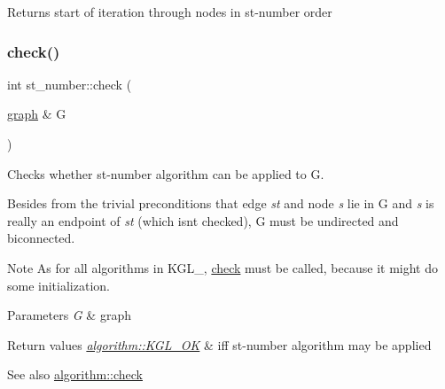 \begin{DoxyReturn}{Returns}
start of iteration through nodes in st-\/number order 
\end{DoxyReturn}
\mbox{\label{classst__number_a2aad4550b821c52d6998bff35fd8648f}} 
\subsubsection{\texorpdfstring{check()}{check()}}
{\footnotesize\ttfamily int st\+\_\+number\+::check (\begin{DoxyParamCaption}\item[{\mbox{\hyperlink{classgraph}{graph}} \&}]{G }\end{DoxyParamCaption})\hspace{0.3cm}{\ttfamily [virtual]}}



Checks whether st-\/number algorithm can be applied to {\ttfamily G}. 

Besides from the trivial preconditions that edge {\itshape st} and node {\itshape s} lie in {\ttfamily G} and {\itshape s} is really an endpoint of {\itshape st} (which isn\textquotesingle{}t checked), {\ttfamily G} must be undirected and biconnected. \begin{DoxyNote}{Note}
As for all algorithms in K\+G\+L\+\_\+, \mbox{\hyperlink{classst__number_a2aad4550b821c52d6998bff35fd8648f}{check}} must be called, because it might do some initialization.
\end{DoxyNote}

\begin{DoxyParams}{Parameters}
{\em G} & graph\\
\hline
\end{DoxyParams}

\begin{DoxyRetVals}{Return values}
{\em \mbox{\hyperlink{classalgorithm_af1a0078e153aa99c24f9bdf0d97f6710aae4c1cd7fe8d8cf4b143241a6e7c31cf}{algorithm\+::\+K\+G\+L\+\_\+\+OK}}} & iff st-\/number algorithm may be applied\\
\hline
\end{DoxyRetVals}
\begin{DoxySeeAlso}{See also}
\mbox{\hyperlink{classalgorithm_a76361fb03ad1cf643affc51821e43bed}{algorithm\+::check}} 
\end{DoxySeeAlso}



